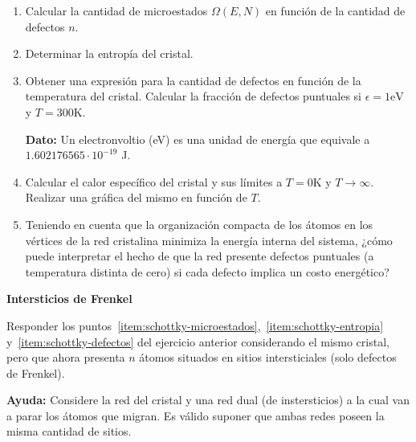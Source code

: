 \documentclass[a4paper,11pt]{article}
\begin{document}
\begin{enumerate}[label=(\alph*),
                  leftmargin=2\parindent,
                  rightmargin=2\parindent]

    \item{\label{item:schottky-microestados}
          Calcular la cantidad de microestados $\Omega(E, N)$ en
          función de la cantidad de defectos $n$.
          }

    \item{\label{item:schottky-entropia}
          Determinar la entropía del cristal.}

    \item{\label{item:schottky-defectos}
          Obtener una expresión para la cantidad de defectos en
          función de la temperatura del cristal.
          Calcular la fracción de defectos puntuales si
          $\epsilon = 1 \text{eV}$ y $T = 300 \text{K}$.
          }

    {\small
    \textbf{Dato:}
    Un electronvoltio (eV) es una unidad de energía que equivale a
    $1.602176565 \cdot 10^{-19}$ J.
    }

    \item{\label{item:schottky-cv}
          Calcular el calor específico del cristal y sus límites
          a $T = 0 \text{K}$ y $T \rightarrow \infty$.
          Realizar una gráfica del mismo en función de $T$.
          }

    \item{Teniendo en cuenta que la organización compacta de los átomos
          en los vértices de la red cristalina minimiza la energía
          interna del sistema, ¿cómo puede interpretar el hecho de que
          la red presente defectos puntuales (a temperatura distinta de
          cero) si cada defecto implica un costo energético?
          }

\end{enumerate}


\textbf{Intersticios de Frenkel}
\vspace{0.5em}

Responder los puntos~\ref{item:schottky-microestados},~\ref{item:schottky-entropia}
y~\ref{item:schottky-defectos} del ejercicio anterior considerando el mismo cristal,
pero que ahora presenta $n$ átomos situados en sitios intersticiales (solo defectos de
Frenkel).

\vspace{0.5em}
{\small
\textbf{Ayuda:} Considere la red del cristal y una red dual (de
instersticios) a la cual van a parar los átomos que migran. Es válido
suponer que ambas redes poseen la misma cantidad de sitios.
}
\end{document}

